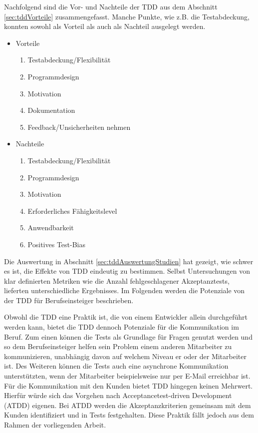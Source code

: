 Nachfolgend sind die Vor- und Nachteile der TDD aus dem Abschnitt \ref{sec:tddVorteile} zusammengefasst. Manche Punkte, wie z.B. die Testabdeckung, konnten sowohl als Vorteil als auch als Nachteil ausgelegt werden.
\begin{itemize}
\item Vorteile
\begin{enumerate}
  \item Testabdeckung/Flexibilität
  \item Programmdesign
  \item Motivation
  \item Dokumentation
  \item Feedback/Unsicherheiten nehmen
\end{enumerate}
\item Nachteile
\begin{enumerate}
  \item Testabdeckung/Flexibilität
  \item Programmdesign
  \item Motivation
  \item Erforderliches Fähigkeitslevel
  \item Anwendbarkeit
  \item Positives Test-Bias
\end{enumerate}
\end{itemize}

Die Auswertung in Abschnitt \ref{sec:tddAuswertungStudien} hat gezeigt, wie schwer es ist, die Effekte von TDD eindeutig zu bestimmen. Selbst Untersuchungen von klar definierten Metriken wie die Anzahl fehlgeschlagener Akzeptanztests, lieferten unterschiedliche Ergebnisses. Im Folgenden werden die Potenziale von der TDD für Berufseinsteiger beschrieben.

Obwohl die TDD eine Praktik ist, die von einem Entwickler allein durchgeführt werden kann, bietet die TDD dennoch Potenziale für die Kommunikation im Beruf. Zum einen können die Tests als Grundlage für Fragen genutzt werden und so dem Berufseinsteiger helfen sein Problem einem anderen Mitarbeiter zu kommunizieren, unabhängig davon auf welchem Niveau er oder der Mitarbeiter ist. Des Weiteren können die Tests auch eine asynchrone Kommunikation unterstützten, wenn der Mitarbeiter beispielsweise nur per E-Mail erreichbar ist. Für die Kommunikation mit den Kunden bietet TDD hingegen keinen Mehrwert. Hierfür würde sich das Vorgehen nach Acceptancetest-driven Development (ATDD) \cite{Pugh2011Lean-agileCollaboration} eigenen. Bei ATDD werden die Akzeptanzkriterien gemeinsam mit dem Kunden identifiziert und in Tests festgehalten. Diese Praktik fällt jedoch aus dem Rahmen der vorliegenden Arbeit.

